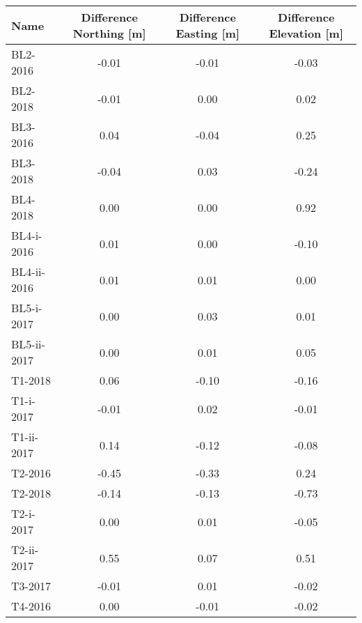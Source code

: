\begin{tabular}{lccc}
\toprule
        Name &  Difference Northing [m] &  Difference Easting [m] &  Difference Elevation [m] \\
\midrule
    BL2-2016 &                    -0.01 &                   -0.01 &                     -0.03 \\
    BL2-2018 &                    -0.01 &                    0.00 &                      0.02 \\
    BL3-2016 &                     0.04 &                   -0.04 &                      0.25 \\
    BL3-2018 &                    -0.04 &                    0.03 &                     -0.24 \\
    BL4-2018 &                     0.00 &                    0.00 &                      0.92 \\
  BL4-i-2016 &                     0.01 &                    0.00 &                     -0.10 \\
 BL4-ii-2016 &                     0.01 &                    0.01 &                      0.00 \\
  BL5-i-2017 &                     0.00 &                    0.03 &                      0.01 \\
 BL5-ii-2017 &                     0.00 &                    0.01 &                      0.05 \\
     T1-2018 &                     0.06 &                   -0.10 &                     -0.16 \\
   T1-i-2017 &                    -0.01 &                    0.02 &                     -0.01 \\
  T1-ii-2017 &                     0.14 &                   -0.12 &                     -0.08 \\
     T2-2016 &                    -0.45 &                   -0.33 &                      0.24 \\
     T2-2018 &                    -0.14 &                   -0.13 &                     -0.73 \\
   T2-i-2017 &                     0.00 &                    0.01 &                     -0.05 \\
  T2-ii-2017 &                     0.55 &                    0.07 &                      0.51 \\
     T3-2017 &                    -0.01 &                    0.01 &                     -0.02 \\
     T4-2016 &                     0.00 &                   -0.01 &                     -0.02 \\

\end{tabular}
